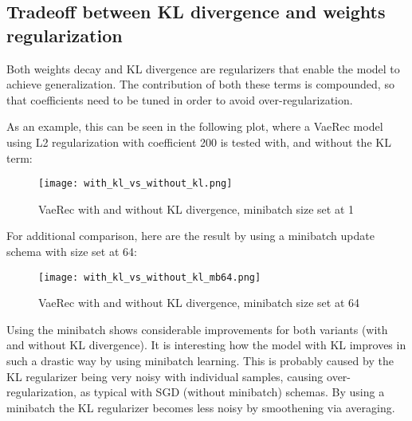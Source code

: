 \subsection{Tradeoff between KL divergence and weights regularization}

Both weights decay and KL divergence are regularizers that enable the model to achieve
generalization. The contribution of both these terms is compounded, so that 
coefficients need to be tuned in order to avoid over-regularization.

As an example, this can be seen in the following plot, where a VaeRec model
using L2 regularization with coefficient 200 is tested with, and without
the KL term:

\begin{figure}[H]
\texttt{[image: with\_kl\_vs\_without\_kl.png]}
\caption{VaeRec with and without KL divergence, minibatch size set at 1}
\end{figure}

For additional comparison, here are the result by using a minibatch update schema
with size set at 64:

\begin{figure}[H]
\texttt{[image: with\_kl\_vs\_without\_kl\_mb64.png]}
\caption{VaeRec with and without KL divergence, minibatch size set at 64}
\end{figure}

Using the minibatch shows considerable improvements for both variants (with and without KL
divergence).  It is interesting how the model with KL improves in such a drastic way
by using minibatch learning. This is probably caused by the KL regularizer being
very noisy with individual samples, causing over-regularization, as typical with SGD
(without minibatch) schemas. By using a minibatch
the KL regularizer becomes less noisy by smoothening via averaging. 
